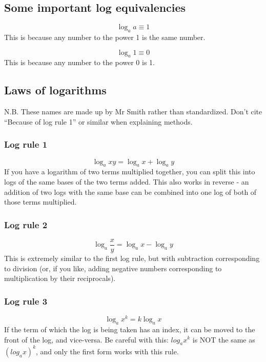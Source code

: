 \subsection{Some important log equivalencies}
\begin{equation}
	\log_{a}a \equiv 1
\end{equation}
This is because any number to the power 1 is the same number.

\begin{equation}
	\log_{a}1 \equiv 0
\end{equation}
This is because any number to the power 0 is 1.

\subsection{Laws of logarithms}
N.B. These names are made up by Mr Smith rather than standardized. Don't cite ``Because of log rule 1'' or similar when explaining methods.
\subsubsection{Log rule 1}
\begin{equation}
	\log_{a}xy=\log_{a}x+\log_{a}y
\end{equation}
If you have a logarithm of two terms multiplied together, you can split this into logs of the same bases of the two terms added. This also works in reverse - an addition of two logs with the same base can be combined into one log of both of those terms multiplied.

\subsubsection{Log rule 2}
\begin{equation}
	\log_{a}\frac{x}{y}=\log_{a}x-\log_{a}y
\end{equation}
This is extremely similar to the first log rule, but with subtraction corresponding to division (or, if you like, adding negative numbers corresponding to multiplication by their reciprocals).

\subsubsection{Log rule 3}
\begin{equation}
	\log_{a}x^k=k\log_{a}x
\end{equation}
If the term of which the log is being taken has an index, it can be moved to the front of the log, and vice-versa. Be careful with this: $log_{a}x^k$ is NOT the same as $(log_{a}x)^k$, and only the first form works with this rule.

